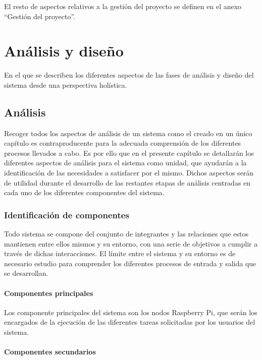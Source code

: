 El resto de aspectos relativos a la gestión del proyecto se definen en el anexo ``Gestión del proyecto''.

\chapter{Análisis y diseño}
\label{chapter:analisis}

\begin{cabstract}
En el que se describen los diferentes aspectos de las fases de análisis y diseño del sistema desde una perspectiva holística.
\end{cabstract}

\section{Análisis}

Recoger todos los aspectos de análisis de un sistema como el creado en un único capítulo es contraproducente para la adecuada comprensión de los diferentes procesos llevados a cabo. Es por ello que en el presente capítulo se detallarán los diferentes aspectos de análisis para el sistema como unidad, que ayudarán a la identificación de las necesidades a satisfacer por el mismo. Dichos aspectos serán de utilidad durante el desarrollo de las restantes etapas de análisis centradas en cada uno de los diferentes componentes del sistema.

\subsection{Identificación de componentes}

Todo sistema se compone del conjunto de integrantes y las relaciones que estos mantienen entre ellos mismos y su entorno, con una serie de objetivos a cumplir a través de dichas interacciones. El límite entre el sistema y su entorno es de necesario estudio para comprender los diferentes procesos de  entrada y salida que se desarrollan.

\subsubsection{Componentes principales} 

Los componente principales del sistema son los nodos Raspberry Pi, que serán los encargados de la ejecución de las diferentes tareas solicitadas por los usuarios del sistema.

\subsubsection{Componentes secundarios}

